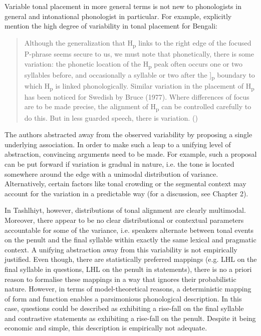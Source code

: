 Variable tonal placement in more general terms is not new to phonologists in general and intonational phonologist in particular. For example, \citet{HayesLahiri1991} explicitly mention the high degree of variability in tonal placement for Bengali:

\begin{quote} Although the generalization that H\textsubscript{p} links to the right edge of the focused P-phrase seems secure to us, we must note that phonetically, there is some variation: the phonetic location of the H\textsubscript{p} peak often occurs one or two syllables before, and occasionally a syllable or two after the ]\textsubscript{p} boundary to which H\textsubscript{p} is linked phonologically. Similar variation in the placement of H\textsubscript{p} has been noticed for Swedish by Bruce (1977). Where differences of focus are to be made precise, the alignment of H\textsubscript{p} can be controlled carefully to do this. But in less guarded speech, there is variation. (\citealt[65]{HayesLahiri1991})
\end{quote}

The authors abstracted away from the observed variability by proposing a single underlying association. In order to make such a leap to a unifying level of abstraction, convincing arguments need to be made. For example, such a proposal can be put forward if variation is gradual in nature, i.e. the tone is located somewhere around the edge with a unimodal distribution of variance. Alternatively, certain factors like tonal crowding or the segmental context may account for the variation in a predictable way (for a discussion, see Chapter 2).

In Tashlhiyt, however, distributions of tonal alignment are clearly multimodal. Moreover, there appear to be no clear distributional or contextual parameters accountable for some of the variance, i.e. speakers alternate between tonal events on the penult and the final syllable within exactly the same lexical and pragmatic context. A unifying abstraction away from this variability is not empirically justified. Even though, there are statistically preferred mappings (e.g. LHL on the final syllable in questions, LHL on the penult in statements), there is no a priori reason to formalise these mappings in a way that ignores their probabilistic nature. However, in terms of model-theoretical reasons, a deterministic mapping of form and function enables a parsimonious phonological description. In this case, questions could be described as exhibiting a rise-fall on the final syllable and contrastive statements as exhibiting a rise-fall on the penult. Despite it being economic and simple, this description is empirically not adequate.

